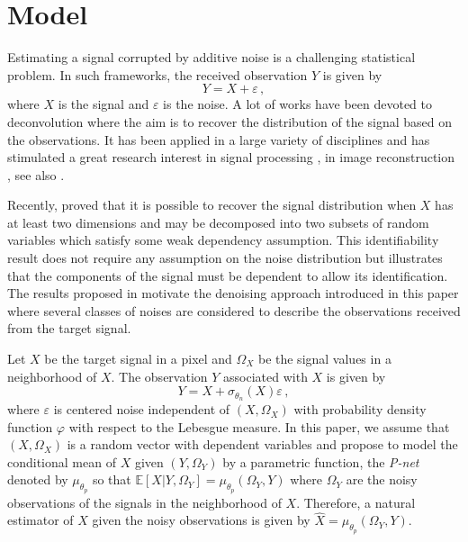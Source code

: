 \documentclass{article}
\begin{document}
\section{Model}
\label{sec:model}

Estimating a signal corrupted by additive noise  is a challenging statistical problem. In such frameworks, the received observation $Y$ is given by
\begin{equation*}
Y = X + \varepsilon\,,
\end{equation*}
where $X$ is the signal and $\varepsilon$ is the noise. A lot of works have been devoted to deconvolution where the aim is to recover the distribution of the signal based on the observations. It has been applied in a large variety of disciplines and has stimulated a great research interest in signal processing \cite{moulines1997maximum,attias1998blind}, in image reconstruction \cite{kundur1996blind,campisi2017blind}, see also  \cite{meister:2009}. 

Recently, \cite{gassiat:lecorff:lehericy:2021} proved that it is possible to recover the signal distribution when $X$ has at least two dimensions and may be decomposed into two subsets of random variables which satisfy some weak dependency assumption. This identifiability result does not require any assumption on the noise distribution but illustrates that the components of the signal must be dependent to allow its identification. The results proposed in \cite{gassiat:lecorff:lehericy:2021} motivate the denoising approach introduced in this paper where several classes of noises are considered to describe the observations received from the target signal.  %

Let $X$ be the target signal in a pixel and $\Omega_X$ be the signal values in a neighborhood of $X$.  The observation $Y$ associated with $X$  is given by
\begin{equation}
\label{eq:def:Y}
Y = X + \sigma_{\theta_n}(X)\varepsilon\,,
\end{equation}
where $\varepsilon$ is centered noise independent of $(X,\Omega_X)$ with probability density function $\varphi$ with respect to the Lebesgue measure. In this paper, we assume that $(X,\Omega_X)$ is a random vector with dependent variables and propose to model the conditional mean of $X$ given $(Y,\Omega_Y)$ by a parametric function, the {\em P-net} denoted by $\mu_{\theta_p}$ so that $\mathbb{E}[X|Y,\Omega_Y] = \mu_{\theta_p}(\Omega_Y,Y)$ where $\Omega_Y$ are the noisy observations of the signals in the neighborhood of $X$. Therefore, a natural estimator of $X$ given the noisy observations is given by $\widehat X = \mu_{\theta_p}(\Omega_Y,Y)$.
\end{document}
